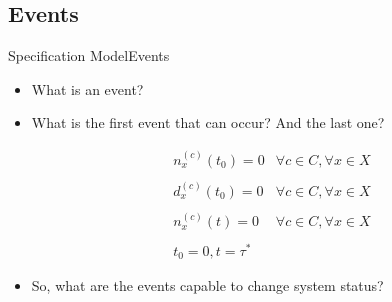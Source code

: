 \documentclass[10pt]{beamer}
\begin{document}
\subsection{Events}
\begin{frame}{Specification Model}{Events}

\begin{itemize}
\item What is an event?
\item What is the first event that can occur? And the last one?

\begin{equation}
\begin{array} {lr} 

n_x^{(c)}(t_0) = 0 & \forall c \in C, \forall x \in X \\\\
d_x^{(c)}(t_0) = 0 & \forall c \in C, \forall x \in X \\\\
n_x^{(c)}(t) = 0 & \forall c \in C, \forall x \in X \\\\
t_0 = 0, t = \tau^*
\end{array}
\end{equation}



\item So, what are the events capable to change system status?
\end{itemize}

\end{frame}
\end{document}
